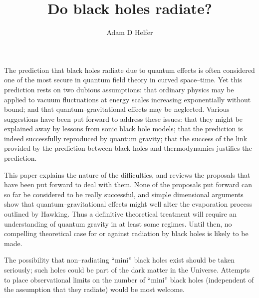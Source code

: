 \def\fnote#1{\global\advance\FEET by 1\footnote{${}^{\the\FEET}$}{#1}} %
\def\ignore#1{\relax}                                                  %
\pptstyle
\title{Do black holes radiate?}

\author{Adam D Helfer}

\address{Department of Mathematics, Mathematical Sciences Building, 
University of Missouri, Columbia, Missouri 65211, U.S.A.}

\raggedbottom


\beginabstract
The prediction that black holes radiate due to quantum effects is often
considered one of the most secure in quantum field theory in curved
space--time.  Yet this prediction rests on two dubious assumptions:  that
ordinary physics may be applied to vacuum fluctuations at energy scales
increasing exponentially without bound; and that quantum--gravitational effects
may be neglected.  Various suggestions have been put forward to address these
issues:  that they might be explained away by lessons from sonic black hole
models; that the prediction is indeed successfully reproduced by quantum
gravity; that the success of the link provided by the prediction between black
holes and thermodynamics justifies the prediction.

\cabs
This paper explains the nature of the difficulties, and reviews the proposals
that have been put forward to deal with them.   None of the proposals put
forward can so far be considered to be really successful, and simple
dimensional arguments show that quantum--gravitational effects might well alter
the evaporation process outlined by Hawking.   Thus a definitive theoretical
treatment will require an understanding of quantum gravity in at least some
regimes.  Until then, no compelling theoretical case for or against radiation
by black holes is likely to be made.

\cabs
The possibility that non--radiating ``mini'' black holes exist should be taken
seriously; such holes could be part of the dark matter in the Universe.
Attempts to place observational limits on the number of ``mini'' black holes
(independent of the assumption that they radiate) would be most welcome.
\endabstract

